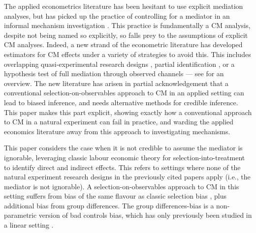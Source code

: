 The applied econometrics literature has been hesitant to use explicit mediation analyses, but has picked up the practice of controlling for a mediator in an informal mechanism investigation \citep{blackwell2024assumption}.
This practice is fundamentally a CM analysis, despite not being named so explicitly, so falls prey to the assumptions of explicit CM analyses.
Indeed, a new strand of the econometric literature has developed estimators for CM effects under a variety of strategies to avoid this.
This includes overlapping quasi-experimental research designs \citep{deuchert2019direct,frolich2017direct,heckman2015econometric}, partial identification \citep{flores2009identification}, or a hypothesis test of full mediation through observed channels \citep{kwon2024testing} --- see \cite{huber2019review} for an overview.
The new literature has arisen in partial acknowledgement that a conventional selection-on-observables approach to CM in an applied setting can lead to biased inference, and needs alternative methods for credible inference.
This paper makes this part explicit, showing exactly how a conventional approach to CM in a natural experiment can fail in practice, and warding the applied economics literature away from this approach to investigating mechanisms.

This paper considers the case when it is not credible to assume the mediator is ignorable, leveraging classic labour economic theory for selection-into-treatment to identify direct and indirect effects.
This refers to settings where none of the natural experiment research designs in the previously cited papers apply (i.e., the mediator is not ignorable).
A selection-on-observables approach to CM in this setting suffers from bias of the same flavour as classic selection bias \citep{heckman1998characterizing}, plus additional bias from group differences.
The group differences-bias is a non-parametric version of bad controls bias, which has only previously been studied in a linear setting \citep{cinelli2024crash,ding2015adjust}.

